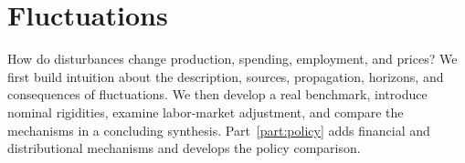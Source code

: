 \clearpage
\part{Fluctuations}\label{part:fluctuations}

How do disturbances change production, spending, employment, and prices?
We first build intuition about the description, sources, propagation, horizons,
and consequences of fluctuations. We then develop a real benchmark, introduce
nominal rigidities, examine labor-market adjustment, and compare the mechanisms
in a concluding synthesis.
Part~\ref{part:policy} adds financial and distributional mechanisms and develops
the policy comparison.








